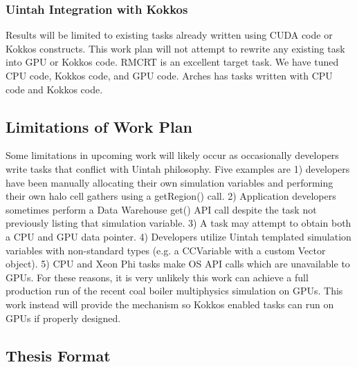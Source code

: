 \documentclass[12pt]{article}
\begin{document}
\subsubsection{Uintah Integration with Kokkos}
\label{ch:workplan-kokkos-integration}
Results will be limited to existing tasks already written using CUDA code or Kokkos constructs.  This work plan will not attempt to rewrite any existing task into GPU or Kokkos code.   RMCRT is an excellent target task.  We have tuned CPU code, Kokkos code, and GPU code.  Arches has tasks written with CPU code and Kokkos code.  

\subsection{Limitations of Work Plan}
\label{ch:workplan-limitations}
Some limitations in upcoming work will likely occur as occasionally developers write tasks that conflict with Uintah philosophy.  Five examples are 1) developers have been manually allocating their own simulation variables and performing their own halo cell gathers using a getRegion() call. 2) Application developers sometimes perform a Data Warehouse get() API call despite the task not previously listing that simulation variable. 3) A task may attempt to obtain both a CPU and GPU data pointer.  4) Developers utilize Uintah templated simulation variables with non-standard types (e.g. a CCVariable with a custom Vector object).  5) CPU and Xeon Phi tasks make OS API calls which are unavailable to GPUs.  For these reasons, it is very unlikely this work can achieve a full production run of the recent coal boiler multiphysics simulation on GPUs.  This work instead will provide the mechanism so Kokkos enabled tasks can run on GPUs if properly designed.  


\subsection{Thesis Format}
\label{ch:thesis_format}
\end{document}
